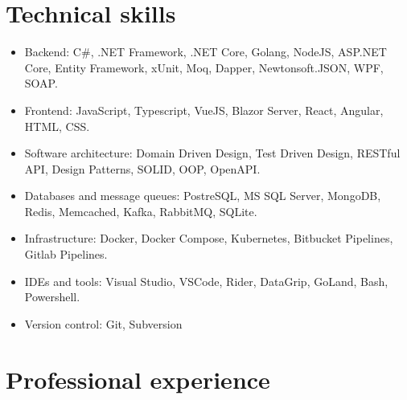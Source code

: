 \documentclass{article}
\begin{document}
\section*{Technical skills}

\begin{itemize}
    \item {
        Backend: C\#, .NET Framework, .NET Core, Golang, NodeJS, ASP.NET Core, Entity Framework, xUnit, Moq, Dapper, Newtonsoft.JSON, WPF, SOAP.
    }
    \item {
        Frontend: JavaScript, Typescript, VueJS, Blazor Server, React, Angular, HTML, CSS.
    }
    \item {
        Software architecture: Domain Driven Design, Test Driven Design, RESTful API, Design Patterns, SOLID, OOP, OpenAPI.
    }
    \item {
        Databases and message queues: PostreSQL, MS SQL Server, MongoDB, Redis, Memcached, Kafka, RabbitMQ, SQLite.
    }
    \item {
        Infrastructure: Docker, Docker Compose, Kubernetes, Bitbucket Pipelines, Gitlab Pipelines.
    }
    \item {
        IDEs and tools: Visual Studio, VSCode, Rider, DataGrip, GoLand, Bash, Powershell.
    }
    \item {
        Version control: Git, Subversion
    }
\end{itemize}

\section*{Professional experience}
\end{document}
